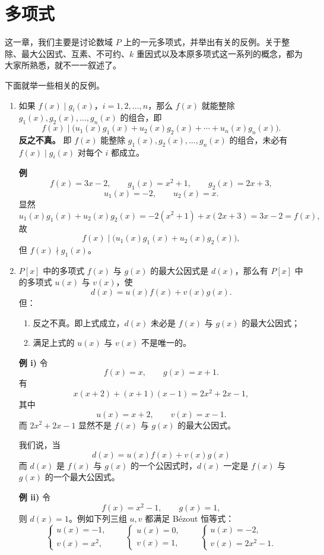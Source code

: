 \chapter{多项式}
这一章，我们主要是讨论数域 $P$ 上的一元多项式，并举出有关的反例。关于整除、最大公因式、互素、不可约、$k$ 重因式以及本原多项式这一系列的概念，都为大家所熟悉，就不一一叙述了。

下面就举一些相关的反例。

\begin{enumerate}
\item 如果 $f(x)\mid g_i(x)$，$i=1,2,\ldots,n$，那么 $f(x)$ 就能整除 $g_1(x),g_2(x),\ldots,g_n(x)$ 的组合，即
\[
 f(x)\mid\bigl(u_1(x)g_1(x)+u_2(x)g_2(x)+\cdots+u_n(x)g_n(x)\bigr).
\]
\textbf{反之不真。} 即 $f(x)$ 能整除 $g_1(x),g_2(x),\ldots,g_n(x)$ 的组合，未必有 $f(x)\mid g_i(x)$ 对每个 $i$ 都成立。

\textbf{例}
\[
 f(x)=3x-2,
 \qquad g_1(x)=x^2+1,
 \qquad g_2(x)=2x+3,
\]
\[
 u_1(x)=-2,
 \qquad u_2(x)=x.
\]
显然
\[
 u_1(x)g_1(x)+u_2(x)g_2(x)
 =-2(x^2+1)+x(2x+3)=3x-2=f(x),
\]
故
\[
 f(x)\mid\bigl(u_1(x)g_1(x)+u_2(x)g_2(x)\bigr),
\]
但 $f(x)\nmid g_1(x)$。

\item $P[x]$ 中的多项式 $f(x)$ 与 $g(x)$ 的最大公因式是 $d(x)$，那么有 $P[x]$ 中的多项式 $u(x)$ 与 $v(x)$，使
\[
 d(x)=u(x)f(x)+v(x)g(x).
\]
但：
\begin{enumerate}[label=\roman*),leftmargin=2.4em,itemsep=0.35em]
\item 反之不真。即上式成立，$d(x)$ 未必是 $f(x)$ 与 $g(x)$ 的最大公因式；
\item 满足上式的 $u(x)$ 与 $v(x)$ 不是唯一的。
\end{enumerate}

\textbf{例 i)} 令
\[
 f(x)=x,\qquad g(x)=x+1.
\]
有
\[
 x(x+2)+(x+1)(x-1)=2x^2+2x-1,
\]
其中
\[
 u(x)=x+2,\qquad v(x)=x-1.
\]
而 $2x^2+2x-1$ 显然不是 $f(x)$ 与 $g(x)$ 的最大公因式。

我们说，当
\[
 d(x)=u(x)f(x)+v(x)g(x)
\]
而 $d(x)$ 是 $f(x)$ 与 $g(x)$ 的一个公因式时，$d(x)$ 一定是 $f(x)$ 与 $g(x)$ 的一个最大公因式。

\textbf{例 ii)} 令
\[
 f(x)=x^2-1,\qquad g(x)=1,
\]
则 $d(x)=1$。例如下列三组 $u,v$ 都满足 Bézout 恒等式：
\[
\begin{cases}
 u(x)=-1,\\
 v(x)=x^2,
\end{cases}
\qquad
\begin{cases}
 u(x)=0,\\
 v(x)=1,
\end{cases}
\qquad
\begin{cases}
 u(x)=-2,\\
 v(x)=2x^2-1.
\end{cases}
\]


\end{enumerate}
